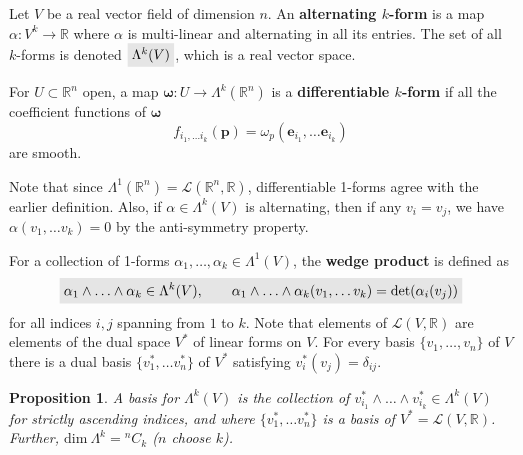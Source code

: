 \documentclass[letter-paper]{tufte-book}
\newtheorem{proposition}[theorem]{\color{pastel-blue}Proposition}
\newcommand{\highlight}[1]{\mathchoice%
  {\colorbox{black!10}{$\displaystyle#1$}}%
  {\colorbox{black!10}{$\textstyle#1$}}%
  {\colorbox{black!10}{$\scriptstyle#1$}}%
  {\colorbox{black!10}{$\scriptscriptstyle#1$}}}%
\begin{document}
Let $V$ be a real vector field of dimension $n$. An \textbf{alternating $k$-form} is a map $\alpha : V^k \to \mathbb{R}$ where $\alpha$ is multi-linear and alternating in all its entries. The set of all $k$-forms is denoted $\highlight{\Lambda^k(V)}$, which is a real vector space.

For $U\subset \mathbb{R}^n$ open, a map $\boldsymbol{\omega} : U \to \Lambda^k(\mathbb{R}^n)$ is a \textbf{differentiable $k$-form} if all the coefficient functions of $\boldsymbol{\omega}$
\begin{equation}
  f_{i_1, \ldots i_k}(\boldsymbol{p}) = \omega_p(\boldsymbol{e}_{i_1}, \ldots \boldsymbol{e}_{i_k})
\end{equation}
are smooth.

Note that since $\Lambda^1(\mathbb{R}^n) = \mathcal{L}(\mathbb{R}^n, \mathbb{R})$, differentiable 1-forms agree with the earlier definition. Also, if $\alpha \in \Lambda^k(V)$ is alternating, then if any $v_i = v_j$, we have $\alpha(v_1, \ldots v_k) = 0$ by the anti-symmetry property.

For a collection of 1-forms $\alpha_1, \ldots, \alpha_k \in \Lambda^1(V)$, the \textbf{wedge product} is defined as
\begin{equation}
  \highlight{\alpha_1 \wedge \ldots \wedge \alpha_k  \in \Lambda^k(V), \qquad \alpha_1 \wedge \ldots \wedge \alpha_k(v_1, \ldots v_k) = \mbox{det}(\alpha_i(v_j))}
\end{equation}
for all indices $i,j$ spanning from $1$ to $k$. Note that elements of $\mathcal{L}(V, \mathbb{R})$ are elements of the dual space $V^*$ of linear forms on $V$. For every basis $\{v_1, \ldots, v_n\}$ of $V$ there is a dual basis $\{v_1^*, \ldots v_n^*\}$ of $V^*$ satisfying $v_i^* (v_j) = \delta_{ij}$.

\begin{proposition}
  A basis for $\Lambda^k(V)$ is the collection of $v_{i_1}^* \wedge \ldots \wedge v_{i_k}^* \in \Lambda^k(V)$ for strictly ascending indices, and where $\{v_1^*, \ldots v_n^*\}$ is a basis of $V^* = \mathcal{L}(V, \mathbb{R})$. Further, $\mbox{dim}\ \Lambda^k = {}^n C_k$ ($n$ choose $k$).
\end{proposition}
\end{document}
